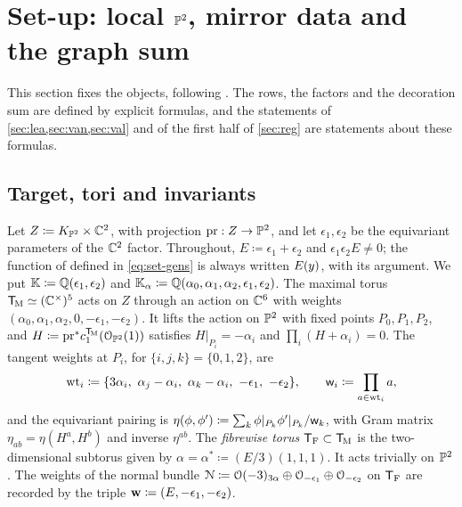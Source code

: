 \section{Set-up: local \texorpdfstring{$\mathbb{P}^2$}{P2}, mirror data and the graph sum}
\label{sec:set}

This section fixes the objects, following . The rows, the factors and the decoration sum are defined by explicit formulas, and the statements of \cref{sec:lea,sec:van,sec:val} and of the first half of \cref{sec:reg} are statements about these formulas.

\subsection{Target, tori and invariants}
\label{sec:set-target}

Let $Z\coloneqq K_{\mathbb{P}^2}\times\mathbb{C}^2$, with projection $\mathrm{pr}:Z\to\mathbb{P}^2$, and let $\epsilon_1,\epsilon_2$ be the equivariant parameters of the $\mathbb{C}^2$ factor. Throughout, $E\coloneqq\epsilon_1+\epsilon_2$ and $\epsilon_1\epsilon_2E\neq 0$; the function of \cite{BS} defined in \eqref{eq:set-gens} is always written $E(y)$, with its argument. We put $\mathbb{K}\coloneqq\mathbb{Q}(\epsilon_1,\epsilon_2)$ and $\mathbb{K}_{\alpha}\coloneqq\mathbb{Q}(\alpha_0,\alpha_1,\alpha_2,\epsilon_1,\epsilon_2)$. The maximal torus $\mathsf{T}_{\!\mathrm{M}}\simeq(\mathbb{C}^\times)^5$ acts on $Z$ through an action on $\mathbb{C}^6$ with weights $(\alpha_0,\alpha_1,\alpha_2,0,-\epsilon_1,-\epsilon_2)$. It lifts the action on $\mathbb{P}^2$ with fixed points $P_0,P_1,P_2$, and $H\coloneqq\mathrm{pr}^*c_1^{\mathsf{T}_{\!\mathrm{M}}}(\mathcal{O}_{\mathbb{P}^2}(1))$ satisfies $H|_{P_i}=-\alpha_i$ and $\prod_{i}(H+\alpha_i)=0$. The tangent weights at $P_i$, for $\{i,j,k\}=\{0,1,2\}$, are
\[
\wts_i\coloneqq\{3\alpha_i,\ \alpha_j-\alpha_i,\ \alpha_k-\alpha_i,\ -\epsilon_1,\ -\epsilon_2\},
\qquad \wprod_i\coloneqq\prod_{a\in\wts_i}a ,
\]
and the equivariant pairing is $\eta(\phi,\phi')\coloneqq\sum_{k}\phi|_{P_k}\phi'|_{P_k}/\mathsf{w}_k$, with Gram matrix $\eta_{ab}=\eta(H^a,H^b)$ and inverse $\eta^{ab}$. The \emph{fibrewise torus} $\mathsf{T}_{\mathrm{F}}\subset\mathsf{T}_{\!\mathrm{M}}$ is the two-dimensional subtorus given by $\alpha=\alpha^*\coloneqq(E/3)(1,1,1)$. It acts trivially on $\mathbb{P}^2$. The weights of the normal bundle $\mathcal{N}\coloneqq\mathcal{O}(-3)_{3\alpha}\oplus\mathcal{O}_{-\epsilon_1}\oplus\mathcal{O}_{-\epsilon_2}$ on $\mathsf{T}_{\mathrm{F}}$ are recorded by the triple $\mathbf{w}\coloneqq(E,-\epsilon_1,-\epsilon_2)$.


